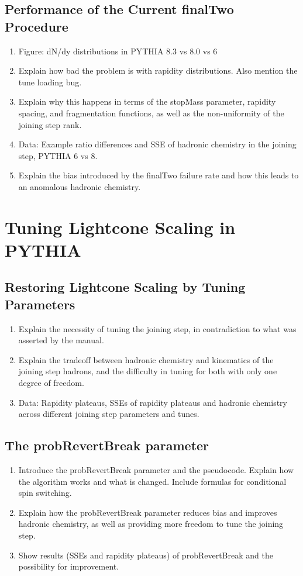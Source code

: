 \documentclass[12pt,a4paper]{report}
\begin{document}
\section{Performance of the Current finalTwo Procedure}
\begin{enumerate}
\item Figure: dN/dy distributions in PYTHIA 8.3 vs 8.0 vs 6
\item Explain how bad the problem is with rapidity distributions. Also mention the tune loading bug.
\item Explain why this happens in terms of the stopMass parameter, rapidity spacing, and fragmentation functions, as well as the non-uniformity of the joining step rank.
\item Data: Example ratio differences and SSE of hadronic chemistry in the joining step, PYTHIA 6 vs 8.
\item Explain the bias introduced by the finalTwo failure rate and how this leads to an anomalous hadronic chemistry.
\end{enumerate}

\chapter{Tuning Lightcone Scaling in PYTHIA}
\section{Restoring Lightcone Scaling by Tuning Parameters}
\begin{enumerate}
\item Explain the necessity of tuning the joining step, in contradiction to what was asserted by the manual.
\item Explain the tradeoff between hadronic chemistry and kinematics of the joining step hadrons, and the difficulty in tuning for both with only one degree of freedom.
\item Data: Rapidity plateaus, SSEs of rapidity plateaus and hadronic chemistry across different joining step parameters and tunes.
\end{enumerate}

\section{The probRevertBreak parameter}
\begin{enumerate}
\item Introduce the probRevertBreak parameter and the pseudocode. Explain how the algorithm works and what is changed. Include formulas for conditional spin switching.
\item Explain how the probRevertBreak parameter reduces bias and improves hadronic chemistry, as well as providing more freedom to tune the joining step.
\item Show results (SSEs and rapidity plateaus) of probRevertBreak and the possibility for improvement.
\end{enumerate}
\end{document}

